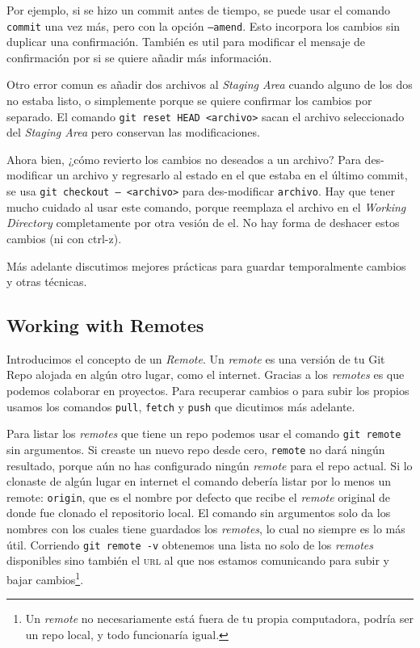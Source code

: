 \documentclass[spanish, 12pt, a4paper]{article}
\begin{document}
Por ejemplo, si se hizo un commit antes de tiempo, se puede usar el comando
\texttt{commit} una vez más, pero con la opción \texttt{--amend}.
Esto incorpora los cambios sin duplicar una confirmación.
También es util para modificar el mensaje de confirmación por si se quiere
añadir más información.

Otro error comun es añadir dos archivos al \textit{Staging Area} cuando alguno
de los dos no estaba listo, o simplemente porque se quiere confirmar los cambios
por separado.
El comando \texttt{git reset HEAD <archivo>} sacan el archivo seleccionado del
\textit{Staging Area} pero conservan las modificaciones.

Ahora bien, ¿cómo revierto los cambios no deseados a un archivo?
Para des-modificar un archivo y regresarlo al estado en el que estaba en el
último commit, se usa \texttt{git checkout -- <archivo>} para des-modificar
\texttt{archivo}.
Hay que tener mucho cuidado al usar este comando, porque reemplaza el archivo en
el \textit{Working Directory} completamente por otra vesión de el. No hay forma
de deshacer estos cambios (ni con ctrl-z).

Más adelante discutimos mejores prácticas para guardar temporalmente cambios y
otras técnicas.

\subsection{Working with Remotes}
Introducimos el concepto de un \textit{Remote}.
Un \textit{remote} es una versión de tu Git Repo alojada en algún otro lugar,
como el internet.
Gracias a los \textit{remotes} es que podemos colaborar en proyectos.
Para recuperar cambios o para subir los propios usamos los comandos
\texttt{pull}, \texttt{fetch} y \texttt{push} que dicutimos más adelante.

Para listar los \textit{remotes} que tiene un repo podemos usar el comando
\texttt{git remote} sin argumentos.
Si creaste un nuevo repo desde cero, \texttt{remote} no dará ningún resultado,
porque aún no has configurado ningún \textit{remote} para el repo actual.
Si lo clonaste de algún lugar en internet el comando debería listar por lo menos
un remote: \texttt{origin}, que es el nombre por defecto que recibe el
\textit{remote} original de donde fue clonado el repositorio local.
El comando sin argumentos solo da los nombres con los cuales tiene guardados los
\textit{remotes}, lo cual no siempre es lo más útil.
Corriendo \texttt{git remote -v} obtenemos una lista no solo de los
\textit{remotes} disponibles sino también el \textsc{url} al que nos estamos
comunicando para subir y bajar cambios\footnote{Un \textit{remote} no
necesariamente está fuera de tu propia computadora, podría ser un repo local, y
todo funcionaría igual.}.
\end{document}
